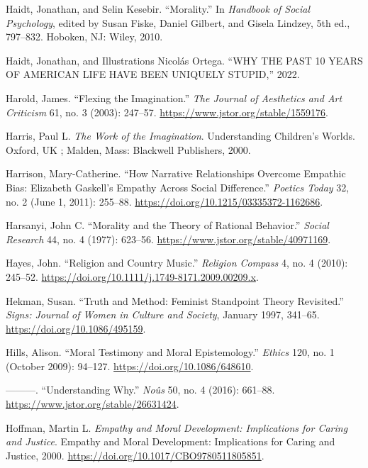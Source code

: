 \documentclass[
  12pt,
]{book}
\newlength{\cslhangindent}
\newenvironment{CSLReferences}[2] %
 {\begin{list}{}{%
  \setlength{\itemindent}{0pt}
  \setlength{\leftmargin}{0pt}
  \setlength{\parsep}{0pt}
  \ifodd #1
   \setlength{\leftmargin}{\cslhangindent}
   \setlength{\itemindent}{-1\cslhangindent}
  \fi
  \setlength{\itemsep}{#2\baselineskip}}}
 {\end{list}}
\theoremstyle{definition}
\theoremstyle{definition}
\theoremstyle{definition}
\theoremstyle{definition}
\theoremstyle{remark}
\begin{document}
\begin{CSLReferences}{1}{0}
Haidt, Jonathan, and Selin Kesebir. {``Morality.''} In \emph{Handbook of Social Psychology}, edited by Susan Fiske, Daniel Gilbert, and Gisela Lindzey, 5th ed., 797--832. Hoboken, NJ: Wiley, 2010.

Haidt, Jonathan, and Illustrations Nicolás Ortega. {``{WHY THE PAST} 10 {YEARS OF AMERICAN LIFE HAVE BEEN UNIQUELY STUPID},''} 2022.

Harold, James. {``Flexing the {Imagination}.''} \emph{The Journal of Aesthetics and Art Criticism} 61, no. 3 (2003): 247--57. \url{https://www.jstor.org/stable/1559176}.

Harris, Paul L. \emph{The {Work} of the {Imagination}}. Understanding {Children}'s {Worlds}. Oxford, UK ; Malden, Mass: Blackwell Publishers, 2000.

Harrison, Mary-Catherine. {``How {Narrative Relationships Overcome Empathic Bias}: {Elizabeth Gaskell}'s {Empathy} Across {Social Difference}.''} \emph{Poetics Today} 32, no. 2 (June 1, 2011): 255--88. \url{https://doi.org/10.1215/03335372-1162686}.

Harsanyi, John C. {``Morality and the {Theory} of {Rational Behavior}.''} \emph{Social Research} 44, no. 4 (1977): 623--56. \url{https://www.jstor.org/stable/40971169}.

Hayes, John. {``Religion and {Country Music}.''} \emph{Religion Compass} 4, no. 4 (2010): 245--52. \url{https://doi.org/10.1111/j.1749-8171.2009.00209.x}.

Hekman, Susan. {``Truth and Method: {Feminist} Standpoint Theory Revisited.''} \emph{Signs: Journal of Women in Culture and Society}, January 1997, 341--65. \url{https://doi.org/10.1086/495159}.

Hills, Alison. {``Moral Testimony and Moral Epistemology.''} \emph{Ethics} 120, no. 1 (October 2009): 94--127. \url{https://doi.org/10.1086/648610}.

---------. {``Understanding {Why}.''} \emph{Noûs} 50, no. 4 (2016): 661--88. \url{https://www.jstor.org/stable/26631424}.

Hoffman, Martin L. \emph{Empathy and Moral Development: {Implications} for Caring and Justice}. Empathy and Moral Development: {Implications} for Caring and Justice, 2000. \url{https://doi.org/10.1017/CBO9780511805851}.


\end{CSLReferences}
\end{document}
